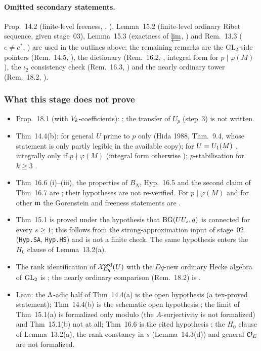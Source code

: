 \paragraph{Omitted secondary statements.}
Prop.~14.2 (finite-level freeness, \stproved, \stformal), Lemma~15.2 (finite-level ordinary Ribet sequence, \stproved{} given
stage~03), Lemma~15.3 (exactness of $\varprojlim$, \stproved) and Rem.~13.3 ($e\ne e^*$, \stcomp) are used in the outlines above; the
remaining remarks are the GL$_2$-side pointers (Rem.~14.5, \stcited{} \cite[Thm.~3.1, Cor.~3.2--3.3]{Hi86b}), the dictionary
(Rem.~16.2, \stpmc, integral form for $p\mid\varphi(M)$ \stsketch), the $\iota_2$ consistency check (Rem.~16.3, \stproved) and the
nearly ordinary tower (Rem.~18.2, \stsketch).

\subsubsection*{What this stage does not prove}
\begin{itemize}
\item Prop.~18.1 (with $V_k$-coefficients): \sttoprove; the transfer of $U_p$ (step~3) is not written.
\item Thm~14.4(b): for general $U$ prime to $p$ only \stexp{} (Hida 1988, Thm.~9.4, whose statement is only partly legible in the
  available copy); for $U=U_1(M)$ \stcited, integrally only if $p\nmid\varphi(M)$ (integral form otherwise \stsketch);
  $p$-stabilisation for $k\ge3$ \stexp.
\item Thm~16.6 (i)--(iii), the properties of $B_N$, Hyp.~16.5 and the second claim of Thm~16.7 are \stcited{} \cite{Hs}; their
  hypotheses are not re-verified. For $p\mid\varphi(M)$ and for other $\mathfrak{m}$ the Gorenstein and freeness statements are \stexp.
\item Thm~15.1 is proved under the hypothesis that $\mathrm{BG}(UU_s,q)$ is connected for every $s\ge1$; this follows from the
  strong-approximation input of stage~02 (\texttt{Hyp.SA}, \texttt{Hyp.HS}) and is not a finite check. The same hypothesis
  enters the $H_0$ clause of Lemma~13.2(a).
\item The rank identification of $\mathcal{X}^{\mathrm{ord}}_{Dq}(U)$ with the $Dq$-new ordinary Hecke algebra of $\mathrm{GL}_2$ is \stexp; the nearly
  ordinary comparison (Rem.~18.2) is \stsketch.
\item Lean: the $\Lambda$-adic half of Thm~14.4(a) is the open hypothesis  (a tex-proved statement);
  Thm~14.4(b) is the schematic open hypothesis ; the limit of Thm~15.1(a) is formalized only modulo
   (the $A$-surjectivity is not formalized) and Thm~15.1(b) not at all; Thm~16.6 is the cited
  hypothesis ; the $H_0$ clause of Lemma~13.2(a), the rank constancy in $s$ (Lemma~14.3(d)) and general
  $\mathcal{O}_E$ are not formalized.
\end{itemize}
